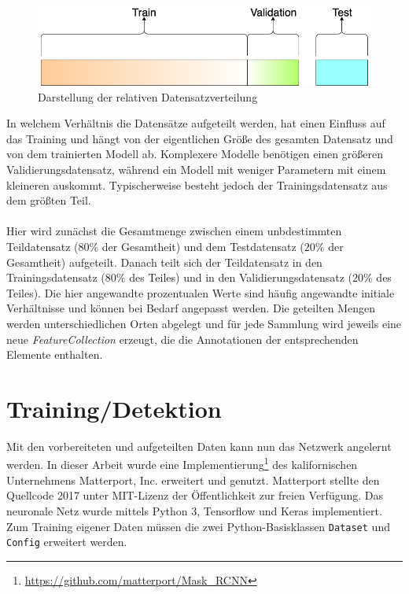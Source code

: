 \begin{figure}[ht]
  \centering
  \includegraphics[width=.9\textwidth]{pics/data-split.png}
  \caption[Datensatzverteilung]{Darstellung der relativen Datensatzverteilung\cite{ref:dataset}}
  \label{fig:split}
\end{figure}
\noindent
In welchem Verhältnis die Datensätze aufgeteilt werden, hat einen Einfluss auf das Training und hängt von der eigentlichen Größe des gesamten Datensatz und von dem trainierten Modell ab. Komplexere Modelle benötigen einen größeren Validierungsdatensatz, während ein Modell mit weniger Parametern mit einem kleineren auskommt.\cite{ref:dataset} Typischerweise besteht jedoch der Trainingsdatensatz aus dem größten Teil. 
\\\\
Hier wird zunächst die Gesamtmenge zwischen einem unbdestimmten Teildatensatz ($80\%$ der Gesamtheit) und dem Testdatensatz ($20\%$ der Gesamtheit) aufgeteilt. Danach teilt sich der Teildatensatz in den Trainingsdatensatz ($80\%$ des Teiles) und in den Validierungsdatensatz ($20\%$ des Teiles). Die hier angewandte prozentualen Werte sind häufig angewandte initiale Verhältnisse und können bei Bedarf angepasst werden. Die geteilten Mengen werden unterschiedlichen Orten abgelegt und für jede Sammlung wird jeweils eine neue \textit{FeatureCollection} erzeugt, die die Annotationen der entsprechenden Elemente enthalten. 


\section{Training/Detektion}\label{sec:training}

Mit den vorbereiteten und aufgeteilten Daten kann nun das Netzwerk angelernt werden. In dieser Arbeit wurde eine Implementierung\footnote{\url{https://github.com/matterport/Mask_RCNN}} des kalifornischen Unternehmens Matterport, Inc. erweitert und genutzt. Matterport stellte den Quellcode 2017 unter MIT-Lizenz der Öffentlichkeit zur freien Verfügung. Das neuronale Netz wurde mittels Python 3, Tensorflow und Keras implementiert. Zum Training eigener Daten müssen die zwei Python-Basisklassen \texttt{Dataset} und \texttt{Config} erweitert werden. 

